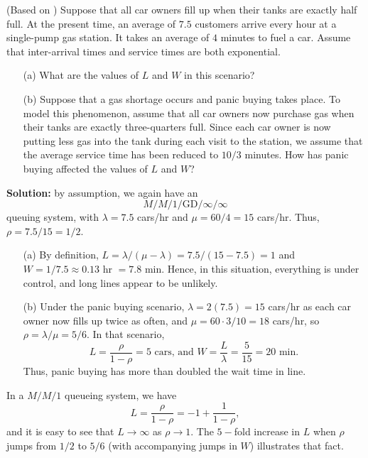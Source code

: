\begin{Example} (Based on \cite{QS_E}) Suppose that all car owners fill up when their tanks are exactly half full.  At the present time, an average of $7.5$ customers arrive every hour at a single-pump gas station. It takes an average of $4$ minutes to fuel a car. Assume that inter-arrival times and service times are both exponential. \begin{itemize}[noitemsep]
	\item[(a)] What are the values of $L$ and $W$ in this scenario? 
	\item[(b)] Suppose that a gas shortage occurs and panic buying takes place. To model this phenomenon, assume that all car owners now purchase gas when their tanks are exactly three-quarters full. Since each car owner is now putting less gas into the tank during each visit to the station, we assume that the average service time has been reduced to $10/3$ minutes. How has panic buying affected the values of $L$ and $W$?
\end{itemize}
\textbf{Solution:} by assumption, we again have an $$M/M/1/\textrm{GD}/\infty/\infty$$ queuing system, with $\lambda = 7.5$ cars/hr and $\mu = 60/4 = 15$ cars/hr.  Thus, $\rho = 7.5/15 = 1/2$.
\begin{enumerate}[noitemsep]
	\item[(a)] By definition, $L = \lambda/(\mu - \lambda) = 7.5/(15-7.5) = 1$ and $W = 1/7.5 \approx 0.13$ hr $=7.8$ min. Hence, in this situation, everything is under control, and long lines appear to be unlikely.
\item[(b)] Under the panic buying scenario,  $\lambda = 2(7.5)=15$ cars/hr as each car owner now fills up twice as often, and $\mu = 60 \cdot 3 /10  = 18$ cars/hr, so $\rho = \lambda/\mu = 5/6$. In that scenario,  
$$ L = \frac{\rho}{1-\rho} = 5 \text{ cars, and } W = \frac{L}{\lambda} = \frac{5}{15} = 20 \text{ min}.$$
Thus, panic buying has more than doubled the wait time in line.
\end{enumerate}
\end{Example}
\newpage\noindent In a $M/M/1$ queueing system, we have $$L=\frac{\rho}{1-\rho}=-1+\frac{1}{1-\rho}, $$ and it is easy to see that $L\to\infty$ as $\rho\to 1$. The $5-$fold increase in $L$ when $\rho$ jumps from $1/2$ to $5/6$ (with accompanying jumps in $W$) illustrates that fact. 
